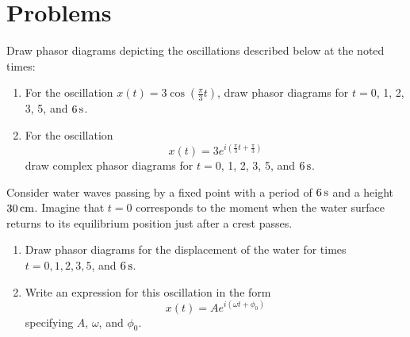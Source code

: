 








\newpage


\section*{Problems}
\label{sec:phasors_problems}


\begin{problem}
Draw phasor diagrams depicting the oscillations described below at the noted times:
  \begin{enumerate}
  \item For the oscillation $x(t) = 3\cos\left(\frac{\pi}{3}t\right)$, draw
phasor diagrams for $t = 0$, 1, 2, 3, 5, and $6\,\mbox{s}$.
  \item For the oscillation 
 \[ x(t) = 3e^{i\left(\frac{\pi}{3}t + \frac{\pi}{3}\right)} \]
draw complex phasor diagrams for $t = 0$, 1, 2, 3, 5, and $6\,\mbox{s}$.
  \end{enumerate}
\end{problem}


\begin{problem}
Consider water waves passing by a fixed point with a period  
of $6\,\mbox{s}$ and a height $30\,\mbox{cm}$. Imagine 
that $t=0$ corresponds to the moment when the water surface returns 
to its equilibrium position just after a crest passes.
  \begin{enumerate}
  \item Draw phasor diagrams for the displacement of the water for times 
$t = 0, 1, 2, 3, 5$, and $6\,\mbox{s}$.
  \item Write an expression for this oscillation in the form
\[ x(t) = Ae^{i\left(\omega t + \phi_0\right)}   \]
specifying $A$, $\omega$, and $\phi_0$.
  \end{enumerate}
\label{prob:waterwaves}
\end{problem}

